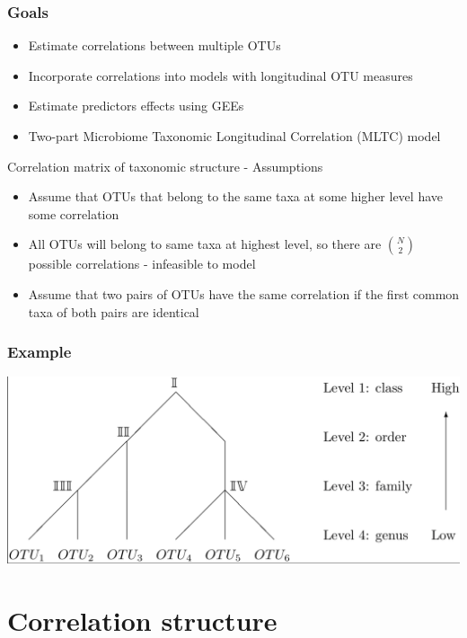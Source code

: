 \documentclass{beamer}
\begin{document}
\begin{frame}
\frametitle{Goals}
\begin{itemize}
  \item Estimate correlations between multiple OTUs
  \item Incorporate correlations into models with longitudinal OTU measures
  \item Estimate predictors effects using GEEs
  \item Two-part Microbiome Taxonomic Longitudinal Correlation (MLTC) model
\end{itemize}
\end{frame}



\begin{frame}[t]{Correlation matrix of taxonomic structure - Assumptions}
  \begin{itemize}
    \item Assume that OTUs that belong to the same taxa at some higher level have some correlation
    \item All OTUs will belong to same taxa at highest level, so there are $\binom{N}{2}$ possible correlations - infeasible to model
    \item Assume that two pairs of OTUs have the same correlation if the first common taxa of both pairs are identical


  \end{itemize}
\end{frame}


\begin{frame}
\frametitle{Example}

\includegraphics[width = \textwidth]{otu_tree.png}

\end{frame}

\section{Correlation structure}
\end{document}
